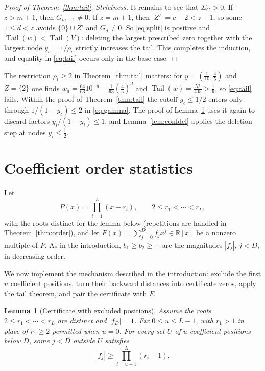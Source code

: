 \documentclass[11pt]{article}
\newtheorem{lemma}[theorem]{Lemma}
\newcommand{\R}{\mathbb R}
\DeclareMathOperator{\Tail}{Tail}
\begin{document}
\begin{proof}[Proof of Theorem~\ref{thm:tail}]
\emph{Strictness.}  It remains to see that $\Sigma_G>0$.  If $z>m+1$, then
$G_{m+1}\ne0$.  If $z=m+1$, then $|Z'|=c-2<z-1$, so some $1\le d<z$ avoids
$\{0\}\cup Z'$ and $G_d\ne0$.  So \eqref{eq:split} is positive and
$\Tail(w)<\Tail(V)$: deleting the largest prescribed zero together with the
largest node $y_c=1/\rho_c$ strictly increases the tail.  This completes the induction, and
equality in \eqref{eq:tail} occurs only in the base case.
\end{proof}

The restriction $\rho_i\ge2$ in Theorem~\ref{thm:tail} matters: for $y=(\frac1{10},\frac45)$ and
$Z=\{2\}$ one finds $w_d=\frac{64}{63}10^{-d}-\frac1{63}(\frac45)^d$ and
$\Tail(w)=\frac{52}{405}>\frac19$, so \eqref{eq:tail} fails.  Within the
proof of Theorem~\ref{thm:tail} the cutoff $y_c\le1/2$ enters only through
$1/(1-y_c)\le2$ in \eqref{eq:gamma}.  The proof of Lemma~\ref{lem:slack}
uses it again to discard factors $y_i/(1-y_i)\le1$, and
Lemma~\ref{lem:confdel} applies the deletion step at nodes $y_i\le\frac12$.

\section{Coefficient order statistics}\label{sec:order}

Let
\[
 P(x)=\prod_{i=1}^L(x-r_i),\qquad 2\le r_1<\cdots<r_L,
\]
with the roots distinct for the lemma below (repetitions are handled in
Theorem~\ref{thm:order}), and let $F(x)=\sum_{j=0}^Df_jx^j\in\R[x]$ be a
nonzero multiple of $P$.  As in the introduction, $b_1\ge b_2\ge\cdots$ are
the magnitudes $|f_j|$, $j<D$, in decreasing order.

We now implement the mechanism described in the introduction: exclude the
first $u$ coefficient positions, turn their backward distances into
certificate zeros, apply the tail theorem, and pair the certificate with
$F$.

\begin{lemma}[Certificate with excluded positions]\label{lem:slack}
Assume the roots $2\le r_1<\cdots<r_L$ are distinct and $|f_D|=1$.  Fix $0\le u\le L-1$, with $r_1>1$
in place of $r_1\ge2$ permitted when $u=0$.  For every set $U$ of $u$
coefficient positions below $D$, some $j<D$ outside $U$ satisfies
\[
 |f_j|\ge\prod_{i=u+1}^L(r_i-1).
\]
\end{lemma}
\end{document}
